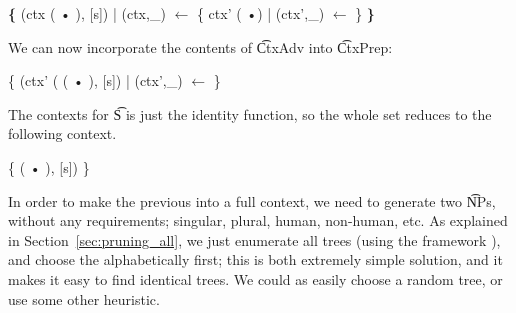 \begin{EmptyItem}
\begin{HighlightingFancy}[]
 \OtherTok{::=} \textbf{\{} (ctx ( • ), [s])
            | (ctx,\_) $\leftarrow$ \{ ctx' (  •)
                         | (ctx',\_) $\leftarrow$  \} 
            \textbf{\}}
\end{HighlightingFancy}
\end{EmptyItem}

\noindent We can now incorporate the contents of \t{CtxAdv} into
\t{CtxPrep}:


\begin{EmptyItem}
\begin{HighlightingFancy}[]
 \OtherTok{::=} \{ (ctx' (  ( • ), [s])
            | (ctx',\_) $\leftarrow$  \} 
\end{HighlightingFancy}
\end{EmptyItem}

\noindent The contexts for \t{S} is just the identity function, so the
whole set reduces to the following context.

\begin{EmptyItem}
\begin{HighlightingFancy}[]
 \OtherTok{::=} \{   ( • ), [s]) \} 
\end{HighlightingFancy}
\end{EmptyItem}

\noindent In order to make the previous into a full context, we need to
generate two \t{NP}s, without any requirements; singular, plural,
human, non-human, etc. As explained in Section~\ref{sec:pruning_all},
we just enumerate all trees (using the \feat{} framework \cite{feat}),
and choose the alphabetically first; this is both extremely simple
solution, and it makes it easy to find identical trees. We could as
easily choose a random tree, or use some other heuristic.




